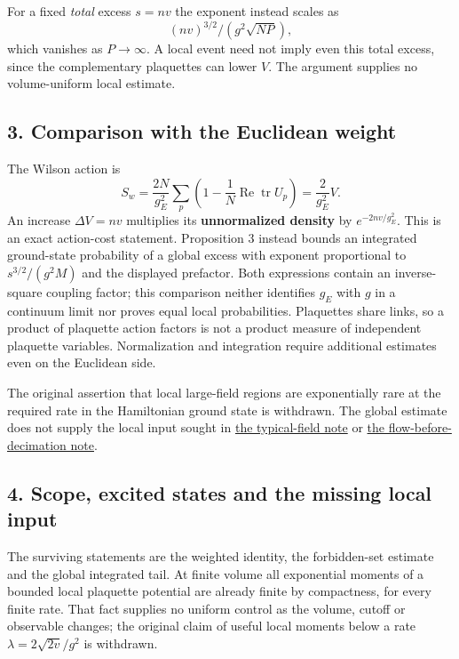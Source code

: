 \documentclass[11pt,a4paper]{article}
\begin{document}
For a fixed \emph{total} excess \(s=nv\) the exponent instead scales as
\[(nv)^{3/2}/(g^2\sqrt{NP}),\] which vanishes as \(P\to\infty\). A local
event need not imply even this total excess, since the complementary
plaquettes can lower \(V\). The argument supplies no volume-uniform
local estimate.

\hypertarget{comparison-with-the-euclidean-weight}{%
\subsection{3. Comparison with the Euclidean
weight}\label{comparison-with-the-euclidean-weight}}

The Wilson action is \[S_w=\frac{2N}{g_E^2}\sum_p\left(1-\frac1N
\operatorname{Re}\operatorname{tr}U_p\right)=\frac{2}{g_E^2}V.\] An
increase \(\Delta V=nv\) multiplies its \textbf{unnormalized density} by
\(e^{-2nv/g_E^2}\). This is an exact action-cost statement. Proposition
3 instead bounds an integrated ground-state probability of a global
excess with exponent proportional to \(s^{3/2}/(g^2M)\) and the
displayed prefactor. Both expressions contain an inverse-square coupling
factor; this comparison neither identifies \(g_E\) with \(g\) in a
continuum limit nor proves equal local probabilities. Plaquettes share
links, so a product of plaquette action factors is not a product measure
of independent plaquette variables. Normalization and integration
require additional estimates even on the Euclidean side.

The original assertion that local large-field regions are exponentially
rare at the required rate in the Hamiltonian ground state is withdrawn.
The global estimate does not supply the local input sought in
\href{flow-jacobian-truncation-error.md\#free-field-size-is-a-benchmark-not-a-supremum-bound}{the
typical-field note} or \href{flow-conjugation-truncation.md}{the
flow-before-decimation note}.

\hypertarget{scope-excited-states-and-the-missing-local-input}{%
\subsection{4. Scope, excited states and the missing local
input}\label{scope-excited-states-and-the-missing-local-input}}

The surviving statements are the weighted identity, the forbidden-set
estimate and the global integrated tail. At finite volume all
exponential moments of a bounded local plaquette potential are already
finite by compactness, for every finite rate. That fact supplies no
uniform control as the volume, cutoff or observable changes; the
original claim of useful local moments below a rate
\(\lambda=2\sqrt{2v}/g^2\) is withdrawn.
\end{document}
